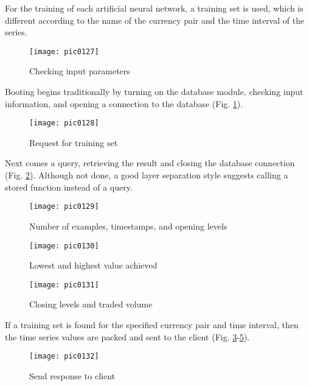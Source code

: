 For the training of each artificial neural network, a training set is used, which is different according to the name of the currency pair and the time interval of the series.

\begin{figure}[h]
\centering
\texttt{[image: pic0127]}
\caption{Checking input parameters}
\label{fig:pic0127}
\end{figure}
\FloatBarrier

Booting begins traditionally by turning on the database module, checking input information, and opening a connection to the database (Fig. \ref{fig:pic0127}).

\begin{figure}[h]
\centering
\texttt{[image: pic0128]}
\caption{Request for training set}
\label{fig:pic0128}
\end{figure}
\FloatBarrier

Next comes a query, retrieving the result and closing the database connection (Fig. \ref{fig:pic0128}). Although not done, a good layer separation style suggests calling a stored function instead of a query.

\begin{figure}[h]
\centering
\texttt{[image: pic0129]}
\caption{Number of examples, timestamps, and opening levels}
\label{fig:pic0129}
\end{figure}
\FloatBarrier

\begin{figure}[h]
\centering
\texttt{[image: pic0130]}
\caption{Lowest and highest value achieved}
\label{fig:pic0130}
\end{figure}
\FloatBarrier

\begin{figure}[h]
\centering
\texttt{[image: pic0131]}
\caption{Closing levels and traded volume}
\label{fig:pic0131}
\end{figure}
\FloatBarrier

If a training set is found for the specified currency pair and time interval, then the time series values are packed and sent to the client (Fig. \ref{fig:pic0129}-\ref{fig:pic0131}).

\begin{figure}[h]
\centering
\texttt{[image: pic0132]}
\caption{Send response to client}
\label{fig:pic0132}
\end{figure}
\FloatBarrier


